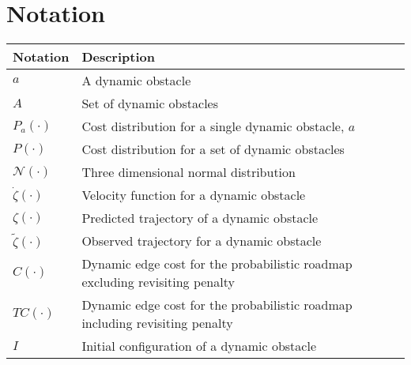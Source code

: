 


\chapter*{Notation}

\begin{table}[h!]

    \centering

    \begin{tabular}{l|l}
    \hline
    Notation                                              & Description                                                                          \\ \hline
    $a$                                                 & A dynamic obstacle                                                                   \\
    $A$                                                 & Set of dynamic obstacles                                                             \\
    $P_a(\cdot)$                              & Cost distribution for a single dynamic obstacle, $a$                               \\
    $P(\cdot)$                                 & Cost distribution for a set of dynamic obstacles                                     \\
    $\mathcal{N}(\cdot)$            & Three dimensional normal distribution                                                \\
    $\dot{\zeta}(\cdot)$   & Velocity function for a dynamic obstacle                                             \\
    $\zeta(\cdot)$                    & Predicted trajectory of a dynamic obstacle                                           \\
    $\tilde{\zeta}(\cdot)$ & Observed trajectory for a dynamic obstacle                                           \\
    $C(\cdot)$                                 & Dynamic edge cost for the probabilistic roadmap excluding revisiting penalty         \\
    $TC(\cdot)$                                & Dynamic edge cost for the probabilistic roadmap including revisiting penalty         \\
    $I$                                                 & Initial configuration of a dynamic obstacle                                          \\

\end{tabular}
\end{table}
